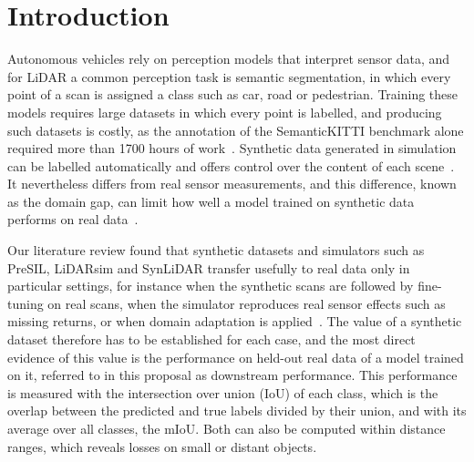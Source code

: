 \section{Introduction}\label{sec:intro}
Autonomous vehicles rely on perception models that interpret sensor data, and for LiDAR a common perception task is semantic segmentation, in which every point of a scan is assigned a class such as car, road or pedestrian. Training these models requires large datasets in which every point is labelled, and producing such datasets is costly, as the annotation of the SemanticKITTI benchmark alone required more than 1700 hours of work~\cite{behleySemanticKITTIDatasetSemantic2019}. Synthetic data generated in simulation can be labelled automatically and offers control over the content of each scene~\cite{hurlPreciseSyntheticImage2019,xiaoTransferLearningSynthetic2022}. It nevertheless differs from real sensor measurements, and this difference, known as the domain gap, can limit how well a model trained on synthetic data performs on real data~\cite{hurlPreciseSyntheticImage2019,manivasagamLiDARsimRealisticLiDAR2020}.

Our literature review found that synthetic datasets and simulators such as PreSIL, LiDARsim and SynLiDAR transfer usefully to real data only in particular settings, for instance when the synthetic scans are followed by fine-tuning on real scans, when the simulator reproduces real sensor effects such as missing returns, or when domain adaptation is applied~\cite{hurlPreciseSyntheticImage2019,manivasagamLiDARsimRealisticLiDAR2020,xiaoTransferLearningSynthetic2022}. The value of a synthetic dataset therefore has to be established for each case, and the most direct evidence of this value is the performance on held-out real data of a model trained on it, referred to in this proposal as downstream performance. This performance is measured with the intersection over union (IoU) of each class, which is the overlap between the predicted and true labels divided by their union, and with its average over all classes, the mIoU. Both can also be computed within distance ranges, which reveals losses on small or distant objects.

